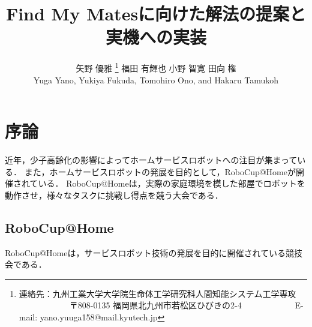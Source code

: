 \documentclass[a4j]{jarticle}
\begin{document}
\title{Find My Matesに向けた解法の提案と実機への実装}



\author{矢野 優雅%
	\thanks{連絡先：九州工業大学大学院生命体工学研究科人間知能システム工学専攻 \newline%
		　　　　　　〒808-0135 福岡県北九州市若松区ひびきの2-4 \newline%
		　　　　　　E-mail: yano.yuuga158@mail.kyutech.jp}\quad%
	福田 有輝也
	小野 智寛
	田向 権\\
	Yuga Yano, \quad \quad Yukiya Fukuda, \quad \quad Tomohiro Ono, and \quad \quad Hakaru Tamukoh}



\maketitle
\thispagestyle{empty}


\section{序論}
近年，少子高齢化の影響によってホームサービスロボットへの注目が集まっている．
また，ホームサービスロボットの発展を目的として，RoboCup@Homeが開催されている．
RoboCup@Homeは，実際の家庭環境を模した部屋でロボットを動作させ，様々なタスクに挑戦し得点を競う大会である．

\subsection{RoboCup@Home}
RoboCup@Homeは，サービスロボット技術の発展を目的に開催されている競技会である．
\end{document}
